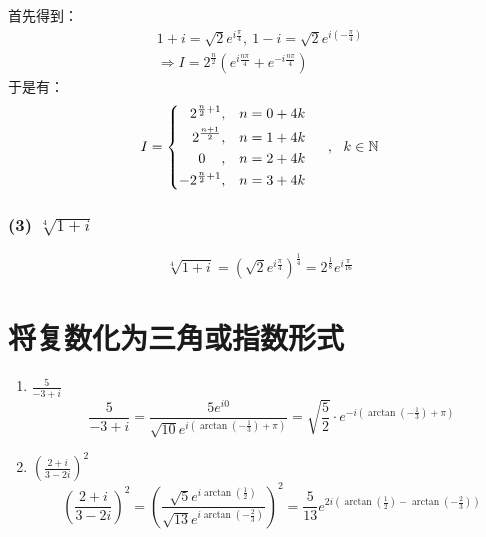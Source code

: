 \documentclass[UTF8]{report}
\def\N{\mathbb{N}}
\theoremstyle{MyLineTheoremStyle} %
\theoremstyle{MyBlockTheoremStyle} %
\theoremstyle{MySubsubsectionStyle} %
\begin{document}
首先得到：
\begin{gather*}
    1+i = \sqrt{2}e^{i\frac{\pi}{4}},\ 1-i = \sqrt{2}e^{i(-\frac{\pi}{4})}\\ \Longrightarrow
    I = 2^{\frac{n}{2}}\left( e^{i\frac{n\pi}{4}} + e^{-i\frac{n\pi}{4}} \right)
\end{gather*}
于是有：
\begin{equation*}
I = 
\begin{cases}
\begin{aligned}
    2^{\frac{n}{2}+1} &, && n = 0 + 4k \\
    2^{\frac{n+1}{2}} &, && n = 1 + 4k \\
    0  \hspace{0.4cm} &, && n = 2 + 4k \\
    -2^{\frac{n}{2}+1}&, && n = 3 + 4k \\
\end{aligned}
\end{cases}\ ,\ \ k \in \N
\end{equation*}


\subsubsection{(3) $\sqrt[4]{1+i}$}
\begin{equation*}
    \sqrt[4]{1+i} = \left(\sqrt{2}e^{i\frac{\pi}{4}}\right)^{\frac{1}{4}} = 2^{\frac{1}{8}}e^{i\frac{\pi}{16}}  
\end{equation*}
\section{将复数化为三角或指数形式}

\begin{enumerate}
\item $\frac{5}{-3 + i}$
\begin{equation*}
    \frac{5}{-3 + i} = \frac{5e^{i0}}{\sqrt{10}e^{i (\arctan (-\frac{1}{3}) + \pi)}} = \sqrt{\frac{5}{2}}\cdot e^{-i (\arctan (-\frac{1}{3}) + \pi)}
\end{equation*}
\item $\left(\frac{2+i}{3-2i}\right)^2$ 
\begin{equation*}
    \left(\frac{2+i}{3-2i}\right)^2 
    = \left( \frac{\sqrt{5}e^{i \arctan(\frac{1}{2})}}{\sqrt{13}e^{i \arctan(-\frac{2}{3})}} \right)^2 
    = \frac{5}{13} e^{2i\left(\arctan(\frac{1}{2}) - \arctan(-\frac{2}{3})\right) }
\end{equation*}
\end{enumerate}
\end{document}
